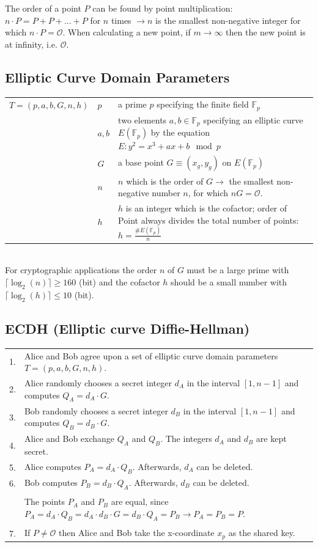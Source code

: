 The order of a point $P$ can be found by point multiplication: $n \cdot P=P+P+...+P$ for $n$ times $\to n$ is the smallest non-negative integer for which $n \cdot P=\mathcal{O}$. 
When calculating a new point, if $m\to \infty$ then the new point is at infinity, i.e. $\mathcal{O}$.\\

\subsection{Elliptic Curve Domain Parameters}
\begin{tabular}{l l p{11cm}}
	$T=(p,a,b,G,n,h)$	&	$p$		&	a prime $p$ specifying the finite field $\mathbb{F}_p$ \\
						&	$a,b$	&	two elements $a,b \in \mathbb{F}_p$ specifying an elliptic curve $E(\mathbb{F}_p)$ by the equation
										$E: y^2=x^3+ax+b \mod p$ \\
						&	$G$		&	a base point $G \equiv (x_g, y_g)$ on $E(\mathbb{F}_p)$\\
						&	$n$		&	$n$ which is the order of $G \to$ the smallest non-negative number $n$, for which $nG=\mathcal{O}$.\\
						&	$h$		& 	$h$ is an integer which is the cofactor; order of Point always divides the total number of points: $h=\frac{ \#E(\mathbb{F}_p) }{n}$ \\
\end{tabular}\\

For cryptographic applications the order $n$ of $G$ must be a large prime with $\lceil \log_2(n) \rceil \geq 160$ (bit) and the cofactor $h$
should be a small number with $\lceil \log_2(h) \rceil \leq 10$ (bit).

\subsection{ECDH (Elliptic curve Diffie-Hellman)}

\begin{tabular}{l p{15cm}}
	1.	&	Alice and Bob agree upon a set of elliptic curve domain parameters $T=(p,a,b,G,n,h)$. \\
	2.	&	Alice randomly chooses a secret integer $d_A$ in the interval $[1,n-1]$ and computes $Q_A=d_A \cdot G$.\\
	3.	&	Bob randomly chooses a secret integer $d_B$ in the interval $[1,n-1]$ and computes $Q_B=d_B \cdot G$.\\
	4.	&	Alice and Bob exchange $Q_A$ and $Q_B$. The integers $d_A$ and $d_B$ are kept secret.\\
	5.	&	Alice computes $P_A=d_A \cdot Q_B$. Afterwards, $d_A$ can be deleted. \\
	6.	&	Bob computes $P_B=d_B \cdot Q_A$. Afterwards, $d_B$ can be deleted. \\
		&	\\
		&	The points $P_A$ and $P_B$ are equal, since $P_A=d_A \cdot Q_B = d_A \cdot d_B \cdot G = d_B \cdot Q_A = P_B \to P_A = P_B = P$.\\
		&	\\
	7.	&	If $P \neq \mathcal{O}$ then Alice and Bob take the x-coordinate $x_p$ as the shared key.
\end{tabular}

